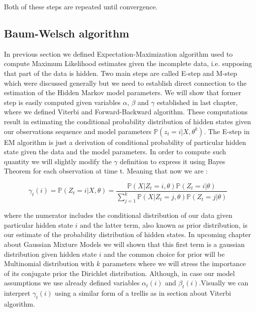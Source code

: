 Both of these steps are repeated until convergence. 

\subsection{Baum-Welsch algorithm}

In previous section we defined Expectation-Maximization algorithm used to compute Maximum Likelihood estimates given the incomplete data, i.e. supposing that part of the data is hidden. Two main steps are called E-step and M-step which were discussed generally but we need to establish direct connection to the estimation of the Hidden Markov model parameters. We will show that former step is easily computed given variables $\alpha$, $\beta$ and $\gamma$ established in last chapter, where we defined Viterbi and Forward-Backward algorithm. These computations result in estimating the conditional probability distribution of hidden states given our observations sequence and model parameters $\mathbb{P}(z_t=i|X,\theta^k)$. The E-step in EM algorithm is just a derivation of conditional probability of particular hidden state given the data and the model parameters. In order to compute such quantity we will slightly modify the $\gamma$ definition to express it using Bayes Theorem for each observation at time t. Meaning that now we are :

\begin{equation}
\gamma_t(i) = \mathbb{P}(Z_t=i|X,\theta) = \frac{\mathbb{P}(X|Z_t=i, \theta) \mathbb{P}(Z_t = i|\theta)}{\sum_{j=1}^k \mathbb{P}(X|Z_t=j,\theta)\mathbb{P}(Z_t = j|\theta)} 
\end{equation}

where the numerator includes the conditional distribution of our data given particular hidden state $i$ and the latter term, also known as prior distribution, is our estimate of the probability distribution of hidden states. In upcoming chapter about Gaussian Mixture Models we will shown that this first term is a gaussian distribution given hidden state $i$ and the common choice for prior will be Multinomial distribution with $k$ parameters where we will stress the importance of its conjugate prior the Dirichlet distribution. Although, in case our model assumptions we use already defined variables $\alpha_t(i)$ and $\beta_t(i)$.Visually we can interpret $\gamma_t(i)$ using a similar form of a trellis as in section about Viterbi algorithm.

